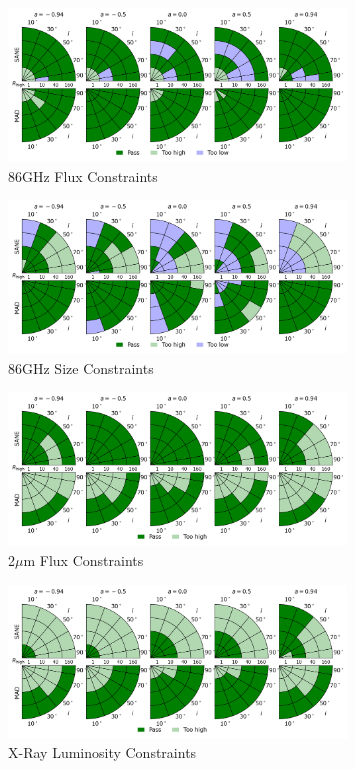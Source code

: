 \begin{figure}
  \centering
  \includegraphics[width=0.8\textwidth]{./figures/86GHz_flux_Constraints.png}
  \caption{86GHz Flux Constraints}
  \label{fig:86GHz_flux_pizza}
\end{figure}
\begin{figure}
  \centering
  \includegraphics[width=0.8\textwidth]{./figures/86GHz_size_Constraints.png}
  \caption{86GHz Size Constraints}
  \label{fig:86GHz_size_pizza}
\end{figure}
\begin{figure}
  \centering
  \includegraphics[width=0.8\textwidth]{./figures/2um_flux_Constraints.png}
  \caption{2$\mu$m Flux Constraints}
  \label{fig:2um_flux_pizza}
\end{figure}
\begin{figure}
  \centering
  \includegraphics[width=0.8\textwidth]{./figures/Xray_flux_Constraints.png}
  \caption{X-Ray Luminosity Constraints}
  \label{fig:xray_pizza}
\end{figure}
